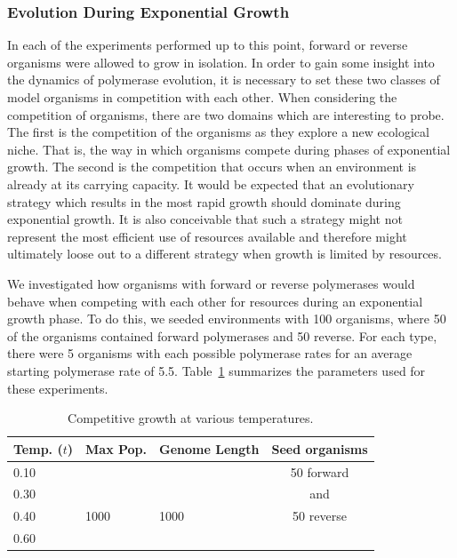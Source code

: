 \subsubsection*{Evolution During Exponential Growth}
In each of the experiments performed up to this point, forward or reverse organisms were allowed to grow in isolation. In order to gain some insight into the dynamics of polymerase evolution, it is necessary to set these two classes of model organisms in competition with each other. When considering the competition of organisms, there are two domains which are interesting to probe. The first is the competition of the organisms as they explore a new ecological niche. That is, the way in which organisms compete during phases of exponential growth. The second is the competition that occurs when an environment is already at its carrying capacity. It would be expected that an evolutionary strategy which results in the most rapid growth should dominate during exponential growth. It is also conceivable that such a strategy might not represent the most efficient use of resources available and therefore might ultimately loose out to a different strategy when growth is limited by resources.

We investigated how organisms with forward or reverse polymerases would behave when competing with each other for resources during an exponential growth phase. To do this, we seeded environments with 100 organisms, where 50 of the organisms contained forward polymerases and 50 reverse. For each type, there were 5 organisms with each possible polymerase rates for an average starting polymerase rate of 5.5. Table~\ref{tab:growth_compet} summarizes the parameters used for these experiments.

\begin{table}
	\begin{center}
		\begin{tabular}[c]{ l | l | l | c }
			Temp. ($t$) & Max Pop. & Genome Length & Seed organisms \\
			\hline
			0.10 & & & 50 forward\\
			0.30 & & & and\\
			0.40 & 1000 & 1000 & 50 reverse\\
			0.60 & & &\\
		\end{tabular}
		\caption{Competitive growth at various temperatures.}
		\label{tab:growth_compet}
	\end{center}
\end{table}

